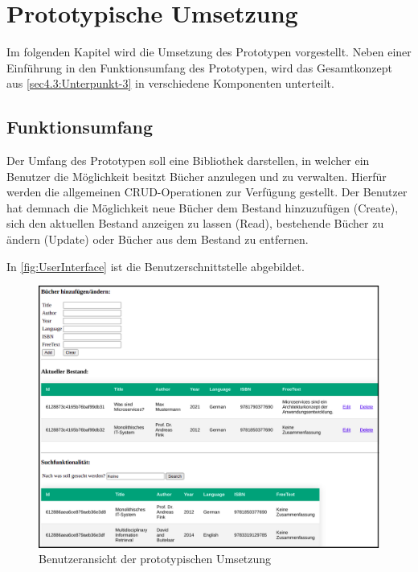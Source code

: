 \chapter{Prototypische Umsetzung\label{chap5:Fuenftes-Kapitel}}

Im folgenden Kapitel wird die Umsetzung des Prototypen vorgestellt. Neben einer Einführung in den Funktionsumfang des Prototypen, wird das Gesamtkonzept aus \autoref{sec4.3:Unterpunkt-3} in verschiedene Komponenten unterteilt.


\section{Funktionsumfang\label{sec5.1:Unterpunkt-1}}

Der Umfang des Prototypen soll eine Bibliothek darstellen, in welcher ein Benutzer die Möglichkeit besitzt Bücher anzulegen und zu verwalten. Hierfür werden die allgemeinen CRUD-Operationen zur Verfügung gestellt. Der Benutzer hat demnach die Möglichkeit neue Bücher dem Bestand hinzuzufügen (Create), sich den aktuellen Bestand anzeigen zu lassen (Read), bestehende Bücher zu ändern (Update) oder Bücher aus dem Bestand zu entfernen.

In \autoref{fig:UserInterface} ist die Benutzerschnittstelle abgebildet.

\begin{figure}[H]
    \centering
    \includegraphics[width=0.9\linewidth]{images/UserInterface.png}
    \caption{Benutzeransicht der prototypischen Umsetzung}
    \label{fig:UserInterface}
\end{figure}

